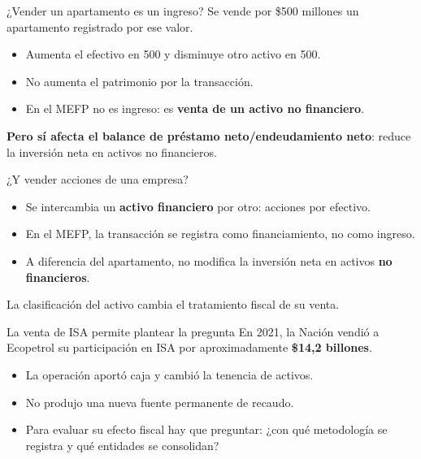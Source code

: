 \begin{frame}{¿Vender un apartamento es un ingreso?}
Se vende por \$500 millones un apartamento registrado por ese valor.
\begin{itemize}
  \item Aumenta el efectivo en 500 y disminuye otro activo en 500.
  \item No aumenta el patrimonio por la transacción.
  \item En el MEFP no es ingreso: es \textbf{venta de un activo no financiero}.
\end{itemize}
\vspace{0.7em}
\textbf{Pero sí afecta el balance de préstamo neto/endeudamiento neto}: reduce la inversión neta en activos no financieros.
\fuenteFMI
\end{frame}

\begin{frame}{¿Y vender acciones de una empresa?}
\begin{itemize}
  \item Se intercambia un \textbf{activo financiero} por otro: acciones por efectivo.
  \item En el MEFP, la transacción se registra como financiamiento, no como ingreso.
  \item A diferencia del apartamento, no modifica la inversión neta en activos \textbf{no financieros}.
\end{itemize}
\vspace{0.7em}
La clasificación del activo cambia el tratamiento fiscal de su venta.
\fuenteFMI
\end{frame}

\begin{frame}{La venta de ISA permite plantear la pregunta}
En 2021, la Nación vendió a Ecopetrol su participación en ISA por aproximadamente \textbf{\$14,2 billones}.
\begin{itemize}
  \item La operación aportó caja y cambió la tenencia de activos.
  \item No produjo una nueva fuente permanente de recaudo.
  \item Para evaluar su efecto fiscal hay que preguntar: ¿con qué metodología se registra y qué entidades se consolidan?
\end{itemize}
\end{frame}

